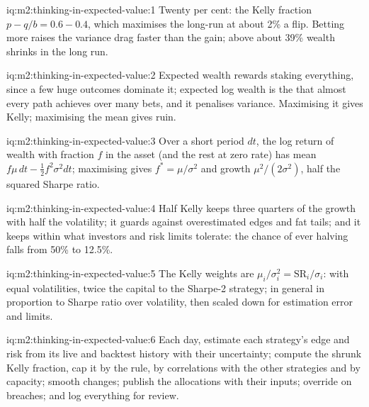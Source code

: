 \begin{solution}{iq:m2:thinking-in-expected-value:1}
Twenty per cent: the Kelly fraction $p - q/b = 0.6 - 0.4$, which maximises the long-run
 at about 2\% a flip. Betting more raises the variance drag faster than the
gain; above about 39\% wealth shrinks in the long run.
\end{solution}

\begin{solution}{iq:m2:thinking-in-expected-value:2}
Expected wealth rewards staking everything, since a few huge outcomes dominate it;
expected log wealth is the  that almost every path achieves over many bets,
and it penalises variance. Maximising it gives Kelly; maximising the mean gives ruin.
\end{solution}

\begin{solution}{iq:m2:thinking-in-expected-value:3}
Over a short period $dt$, the log return of wealth with fraction $f$ in the asset (and
the rest at zero rate) has mean $f\mu\,dt - \tfrac12 f^2\sigma^2 dt$; maximising gives $f^* =
\mu/\sigma^2$ and growth $\mu^2/(2\sigma^2)$, half the squared Sharpe ratio.
\end{solution}

\begin{solution}{iq:m2:thinking-in-expected-value:4}
Half Kelly keeps three quarters of the growth with half the volatility; it guards against
overestimated edges and fat tails; and it keeps  within what investors and
risk limits tolerate: the chance of ever halving falls from 50\% to 12.5\%.
\end{solution}

\begin{solution}{iq:m2:thinking-in-expected-value:5}
The Kelly weights are $\mu_i/\sigma_i^2 = \mathrm{SR}_i/\sigma_i$: with equal volatilities,
twice the capital to the Sharpe-2 strategy; in general in proportion to Sharpe ratio over
volatility, then scaled down for estimation error and limits.
\end{solution}

\begin{solution}{iq:m2:thinking-in-expected-value:6}
Each day, estimate each strategy's edge and risk from its live and backtest history with
their uncertainty; compute the shrunk Kelly fraction, cap it by the  rule, by
correlations with the other strategies and by capacity; smooth changes; publish the
allocations with their inputs; override on breaches; and log everything for review.
\end{solution}
